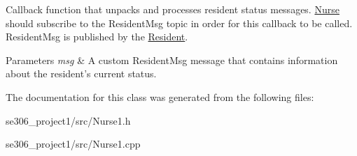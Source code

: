 Callback function that unpacks and processes resident status messages. \hyperlink{classNurse}{Nurse} should subscribe to the Resident\-Msg topic in order for this callback to be called. Resident\-Msg is published by the \hyperlink{classResident}{Resident}. 


\begin{DoxyParams}{Parameters}
{\em msg} & A custom Resident\-Msg message that contains information about the resident's current status. \\
\hline
\end{DoxyParams}


The documentation for this class was generated from the following files\-:\begin{DoxyCompactItemize}
\item 
se306\-\_\-project1/src/Nurse1.\-h\item 
se306\-\_\-project1/src/Nurse1.\-cpp\end{DoxyCompactItemize}
